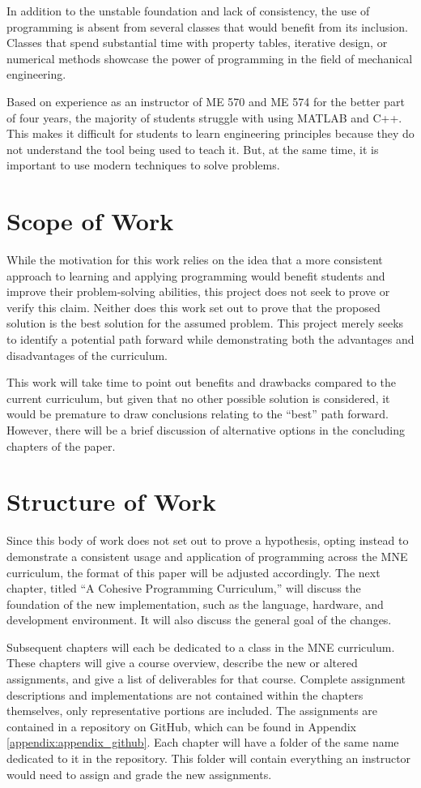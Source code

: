 In addition to the unstable foundation and lack of consistency, the use of programming is 
absent from several classes that would benefit from its inclusion. Classes that spend
substantial time with property tables, iterative design, or numerical methods
showcase the power of programming in the field of mechanical engineering. 

Based on experience as an instructor of ME 570 and ME 574 for the better part of 
four years, the majority of students struggle with using MATLAB and C++. This makes it 
difficult for students to learn engineering principles because they do not understand 
the tool being used to teach it. But, at the same time, it is important to use modern
techniques to solve problems.

\section{Scope of Work}

While the motivation for this work relies on the idea that a more consistent approach to
learning and applying programming would benefit students and improve their problem-solving
abilities, this project does not seek to prove or verify this claim. Neither does this
work set out to prove that the proposed solution is the best solution for the assumed
problem. This project merely seeks to identify a potential path forward while 
demonstrating both the advantages and disadvantages of the curriculum. 

This work will take time to point out benefits and drawbacks compared to the current 
curriculum, but given that no other possible solution is considered, it would be
premature to draw conclusions relating to the ``best'' path forward. However, there 
will be a brief discussion of alternative options in the concluding chapters of the paper.

\section{Structure of Work}

Since this body of work does not set out to prove a hypothesis, opting instead to demonstrate
a consistent usage and application of programming across the MNE curriculum, the format of
this paper will be adjusted accordingly. The next chapter, titled ``A Cohesive Programming
Curriculum,'' will discuss the foundation of the new implementation, such as the language,
hardware, and development environment. It will also discuss the general goal of the changes.

Subsequent chapters will each be dedicated to a class in the MNE curriculum. These chapters
will give a course overview, describe the new or altered assignments, and give a list
of deliverables for that course. Complete assignment descriptions and implementations
are not contained within the chapters themselves, only representative portions are included.
The assignments are contained in a repository on GitHub, which can be found in Appendix 
\ref{appendix:appendix_github}. Each chapter will have a folder of the same name dedicated 
to it in the repository. This folder will contain everything an instructor would need to assign 
and grade the new assignments.
